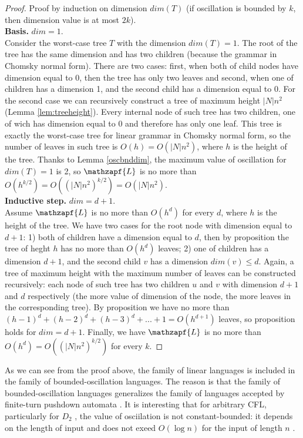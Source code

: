 \begin{proof}
Proof by induction on dimension $dim(T)$ (if oscillation is bounded by $k$, then dimension value is at most $2k$).
\\
\textbf{Basis.} $dim = 1$.
\\
Consider the worst-case tree $T$ with the dimension $dim(T) = 1$. The root of the tree has the same dimension and has two children (because the grammar in Chomsky normal form). There are two cases:  first, when both of child nodes have dimension equal to 0, then the tree has only two leaves and second, when one of children has a dimension 1, and the second child has a dimension equal to 0. For the second case we can recursively construct a tree of maximum height $|N|n^2$ (Lemma \ref{lem:treeheight}). Every internal node of such tree has two children, one of wich has dimension equal to 0 and therefore has only one leaf. This tree is exactly the worst-case tree for linear grammar in Chomsky normal form, so the number of leaves in such tree is $O(h) = O(|N|n^2)$, where $h$ is the height of the tree. Thanks to Lemma \ref{oscbnddim}, the maximum value of oscillation for $dim(T) = 1$ is 2, so $\mathzapf{L}$ is no more than $O(h^{k/2}) = O((|N|n^2)^{k/2}) = O(|N|n^2)$.
\\
\textbf{Inductive step.} $dim = d + 1$.
\\
Assume $\mathzapf{L}$ is no more than $O(h^{d})$ for every $d$, where $h$ is the height of the tree. We have two cases for the root node with dimension equal to $d+1$: 1) both of children have a dimension equal to $d$, then by proposition the tree of heght $h$ has no more than $O(h^{d})$ leaves; 2) one of children has a dimension $d + 1$, and the second child $v$ has a dimension $dim(v) \le d$. Again, a tree of maximum height with the maximum number of leaves can be constructed recursively:  each node of such tree has two children $u$ and $v$ with dimension $d+1$ and $d$ respectively (the more value of dimension of the node, the more leaves in the corresponding tree). By proposition we have no more than $(h-1)^d + (h-2)^d + (h-3)^d + ... + 1 = O(h^{d+1})$ leaves, so proposition holds for $dim = d+1$. Finally, we have $\mathzapf{L}$ is no more than $O(h^{d}) = O((|N|n^2)^{k/2})$ for every $k$.
\end{proof}


As we can see from the proof above, the family of linear languages is included in the family of bounded-oscillation languages. The reason is that the family of bounded-oscillation languages generalizes the family of languages accepted by finite-turn pushdown automata \cite{BoundOsc}. It is interesting that for arbitrary CFL, particularly for $D_2$ , the value of osciilation is not constant-bounded: it depends on the length of input and does not exeed $O(\log n)$ for the input of length $n$ \cite*{Gundermann, Wechsung}.

